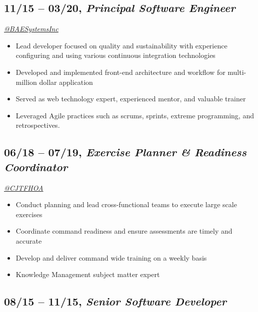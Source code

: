 \documentclass[10pt]{article}
\def\tightlist{}
\begin{document}
\subsection{\texorpdfstring{11/15 -- 03/20, \textbf{\emph{Principal
Software
Engineer}}}{11/15 -- 03/20, Principal Software Engineer}}\label{principal-software-engineer}

\emph{\href{https://twitter.com/BAESystemsInc}{@BAESystemsInc}}

\begin{itemize}
\tightlist
\item
  Lead developer focused on quality and sustainability with experience
  configuring and using various continuous integration technologies
\item
  Developed and implemented front-end architecture and workflow for
  multi-million dollar application
\item
  Served as web technology expert, experienced mentor, and valuable
  trainer
\item
  Leveraged Agile practices such as scrums, sprints, extreme
  programming, and retrospectives.
\end{itemize}

\subsection{\texorpdfstring{06/18 -- 07/19, \textbf{\emph{Exercise
Planner \& Readiness
Coordinator}}}{06/18 -- 07/19, Exercise Planner \& Readiness Coordinator}}\label{exercise-planner-readiness-coordinator}

\emph{\href{https://twitter.com/CJTFHOA}{@CJTFHOA}}

\begin{itemize}
\tightlist
\item
  Conduct planning and lead cross-functional teams to execute large
  scale exercises
\item
  Coordinate command readiness and ensure assessments are timely and
  accurate
\item
  Develop and deliver command wide training on a weekly basis
\item
  Knowledge Management subject matter expert
\end{itemize}

\subsection{\texorpdfstring{08/15 -- 11/15, \textbf{\emph{Senior
Software
Developer}}}{08/15 -- 11/15, Senior Software Developer}}\label{senior-software-developer}
\end{document}
